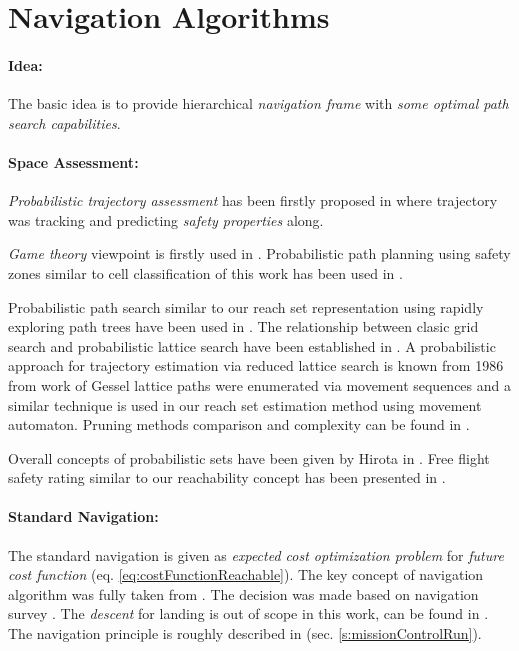 \section{Navigation Algorithms}\label{s:NavigationAlgorithms}
\paragraph{Idea:} The basic idea is to provide hierarchical \emph{navigation frame} with \emph{some optimal path search capabilities}. 


\paragraph{Space Assessment:}\emph{Probabilistic trajectory assessment} has been firstly proposed in \cite{kim2007uav} where trajectory was tracking and predicting \emph{safety properties} along. 

\emph{Game theory} viewpoint is firstly used in \cite{vidal2002probabilistic}. Probabilistic path planning using safety zones similar to cell classification of this work has been used in \cite{pfeiffer2005path}.

Probabilistic path search similar to our reach set representation using rapidly exploring path trees have been used in \cite{kothari2013probabilistically,blackmore2006probabilistic}. The relationship between clasic grid search and probabilistic lattice search have been established in \cite{lavalle2004relationship}. A probabilistic approach for trajectory estimation via reduced lattice search is known from 1986 from work of Gessel \cite{gessel1986probabilistic} lattice paths were enumerated via movement sequences and a similar technique is used in our reach set estimation method using movement automaton.  Pruning methods comparison and complexity can be found in \cite{esposito1997comparative}.

Overall concepts of probabilistic sets have been given by Hirota in \cite{hirota1981concepts}.  Free flight safety rating similar to our reachability concept has been presented in \cite{hoekstra2002designing}.

\paragraph{Standard Navigation:} The standard navigation is given as \emph{expected cost optimization problem} for \emph{future cost function} (eq. \ref{eq:costFunctionReachable}). The key concept of navigation algorithm was fully taken from \cite{gardi2018multi}. The decision was made based on navigation survey \cite{goerzen2010survey}. The \emph{descent} for landing is out of scope in this work, can be found in \cite{lim2018energy}. The navigation principle is roughly described in (sec. \ref{s:missionControlRun}).


